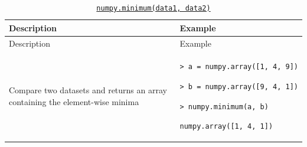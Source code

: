 \documentclass[10pt,a4paperpaper,]{article}
\begin{document}
\begin{longtable}[]{@{}ll@{}}
\caption{\href{http://docs.scipy.org/doc/numpy-1.10.0/reference/generated/numpy.minimum.html}{\texttt{numpy.minimum(data1,\ data2)}}}\tabularnewline
\toprule
\begin{minipage}[b]{0.47\columnwidth}\raggedright\strut
Description
\strut\end{minipage} &
\begin{minipage}[b]{0.47\columnwidth}\raggedright\strut
Example
\strut\end{minipage}\tabularnewline
\midrule
\endfirsthead
\toprule
\begin{minipage}[b]{0.47\columnwidth}\raggedright\strut
Description
\strut\end{minipage} &
\begin{minipage}[b]{0.47\columnwidth}\raggedright\strut
Example
\strut\end{minipage}\tabularnewline
\midrule
\endhead
\begin{minipage}[t]{0.47\columnwidth}\raggedright\strut
Compare two datasets and returns an array containing the element-wise
minima
\strut\end{minipage} &
\begin{minipage}[t]{0.47\columnwidth}\raggedright\strut
\texttt{\textgreater{}\ a\ =\ numpy.array({[}1,\ 4,\ 9{]})}

\texttt{\textgreater{}\ b\ =\ numpy.array({[}9,\ 4,\ 1{]})}

\texttt{\textgreater{}\ numpy.minimum(a,\ b)}

\texttt{numpy.array({[}1,\ 4,\ 1{]})}
\strut\end{minipage}\tabularnewline
\bottomrule
\end{longtable}
\end{document}
